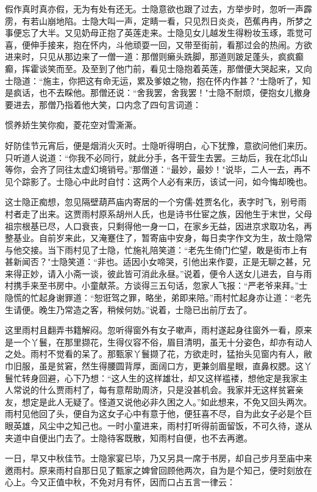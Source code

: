 假作真时真亦假，无为有处有还无。士隐意欲也跟了过去，方举步时，忽听一声霹雳，有若山崩地陷。士隐大叫一声，定睛一看，只见烈日炎炎，芭蕉冉冉，所梦之事便忘了大半。又见奶母正抱了英莲走来。士隐见女儿越发生得粉妆玉琢，乖觉可喜，便伸手接来，抱在怀内，斗他顽耍一回，又带至街前，看那过会的热闹。方欲进来时，只见从那边来了一僧一道：那僧则癞头跣脚，那道则跛足蓬头，疯疯癫癫，挥霍谈笑而至。及至到了他门前，看见士隐抱着英莲，那僧便大哭起来，又向士隐道：“施主，你把这有命无运，累及爹娘之物，抱在怀内作甚？"士隐听了，知是疯话，也不去睬他。那僧还说：“舍我罢，舍我罢！"士隐不耐烦，便抱女儿撤身要进去，那僧乃指着他大笑，口内念了四句言词道：

惯养娇生笑你痴，菱花空对雪澌澌。

好防佳节元宵后，便是烟消火灭时。士隐听得明白，心下犹豫，意欲问他们来历。只听道人说道：“你我不必同行，就此分手，各干营生去罢。三劫后，我在北邙山等你，会齐了同往太虚幻境销号。”那僧道：“最妙，最妙！"说毕，二人一去，再不见个踪影了。士隐心中此时自忖：这两个人必有来历，该试一问，如今悔却晚也。

这士隐正痴想，忽见隔壁葫芦庙内寄居的一个穷儒-姓贾名化，表字时飞，别号雨村者走了出来。这贾雨村原系胡州人氏，也是诗书仕宦之族，因他生于末世，父母祖宗根基已尽，人口衰丧，只剩得他一身一口，在家乡无益，因进京求取功名，再整基业。自前岁来此，又淹蹇住了，暂寄庙中安身，每日卖字作文为生，故士隐常与他交接。当下雨村见了士隐，忙施礼陪笑道：“老先生倚门伫望，敢是街市上有甚新闻否？"士隐笑道：“非也。适因小女啼哭，引他出来作耍，正是无聊之甚，兄来得正妙，请入小斋一谈，彼此皆可消此永昼。”说着，便令人送女儿进去，自与雨村携手来至书房中。小童献茶。方谈得三五句话，忽家人飞报：“严老爷来拜。”士隐慌的忙起身谢罪道：“恕诳驾之罪，略坐，弟即来陪。”雨村忙起身亦让道：“老先生请便。晚生乃常造之客，稍候何妨。”说着，士隐已出前厅去了。

这里雨村且翻弄书籍解闷。忽听得窗外有女子嗽声，雨村遂起身往窗外一看，原来是一个丫鬟，在那里撷花，生得仪容不俗，眉目清明，虽无十分姿色，却亦有动人之处。雨村不觉看的呆了。那甄家丫鬟撷了花，方欲走时，猛抬头见窗内有人，敝巾旧服，虽是贫窘，然生得腰圆背厚，面阔口方，更兼剑眉星眼，直鼻权腮。这丫鬟忙转身回避，心下乃想：“这人生的这样雄壮，却又这样褴褛，想他定是我家主人常说的什么贾雨村了，每有意帮助周济，只是没甚机会。我家并无这样贫窘亲友，想定是此人无疑了。怪道又说他必非久困之人。”如此想来，不免又回头两次。雨村见他回了头，便自为这女子心中有意于他，便狂喜不尽，自为此女子必是个巨眼英雄，风尘中之知己也。一时小童进来，雨村打听得前面留饭，不可久待，遂从夹道中自便出门去了。士隐待客既散，知雨村自便，也不去再邀。

一日，早又中秋佳节。士隐家宴已毕，乃又另具一席于书房，却自己步月至庙中来邀雨村。原来雨村自那日见了甄家之婢曾回顾他两次，自为是个知己，便时刻放在心上。今又正值中秋，不免对月有怀，因而口占五言一律云：


